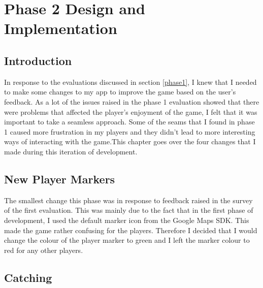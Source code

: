 \documentclass{l4proj}
\begin{document}
\chapter{Phase 2 Design and Implementation}
\label{phase2design}

\section{Introduction}
In response to the evaluations discussed in section \ref{phase1}, I knew that I needed to make some changes to my app
to improve the game based on the user's feedback. As a lot of the issues raised in the phase 1 evaluation showed that
there were problems that affected the player's enjoyment of the game, I felt that it was important to take a seamless
approach. Some of the seams that I found in phase 1 caused more frustration in my players and they didn't lead to more
interesting ways of interacting with the game.This chapter goes over the four changes that I made during this
iteration of development.

\section{New Player Markers}
The smallest change this phase was in response to feedback raised in the survey of the first evaluation. This was mainly
due to the fact that in the first phase of development, I used the default marker icon from the Google Maps SDK. This
made the game rather confusing for the players. Therefore I decided that I would change the colour of the player marker
to green and I left the marker colour to red for any other players. 

\section{Catching}
\end{document}
